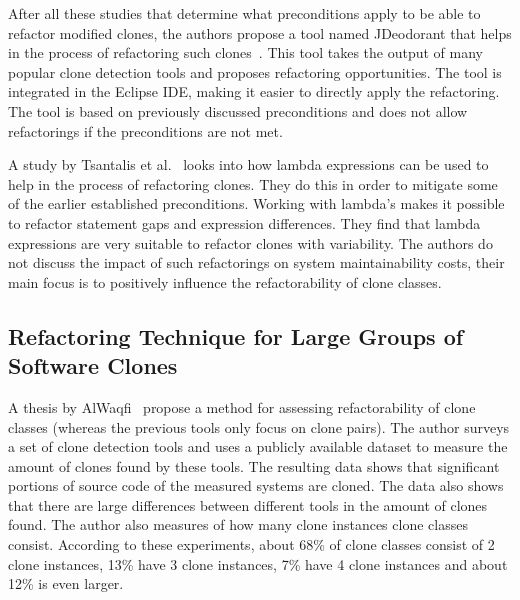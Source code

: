 After all these studies that determine what preconditions apply to be able to refactor modified clones, the authors propose a tool named JDeodorant that helps in the process of refactoring such clones~\cite{mazinanian2016jdeodorant}. This tool takes the output of many popular clone detection tools \cite{kamiya2002ccfinder, deissenboeck2010flexible, jiang2007deckard, NiCAD} %
and proposes refactoring opportunities. The tool is integrated in the Eclipse IDE, making it easier to directly apply the refactoring. The tool is based on previously discussed preconditions and does not allow refactorings if the preconditions are not met.

A study by Tsantalis et al.~\cite{tsantalis2017clone} looks into how lambda expressions can be used to help in the process of refactoring clones. They do this in order to mitigate some of the earlier established preconditions. Working with lambda's makes it possible to refactor statement gaps and expression differences. They find that lambda expressions are very suitable to refactor clones with variability. The authors do not discuss the impact of such refactorings on system maintainability costs, their main focus is to positively influence the refactorability of clone classes.

\subsection{Refactoring Technique for Large Groups of Software Clones}
A thesis by AlWaqfi~\cite{alwaqfi2017refactoring} propose a method for assessing refactorability of clone classes (whereas the previous tools only focus on clone pairs). %
The author surveys a set of clone detection tools \cite{kamiya2002ccfinder, baxter1999clonedr, jiang2007deckard, cordy2011nicad} and uses a publicly available dataset \cite{tsantalis2015assessing} to measure the amount of clones found by these tools. The resulting data shows that significant portions of source code of the measured systems are cloned. The data also shows that there are large differences between different tools in the amount of clones found. The author also measures of how many clone instances clone classes consist. According to these experiments, about 68\% of clone classes consist of 2 clone instances, 13\% have 3 clone instances, 7\% have 4 clone instances and about 12\% is even larger.

